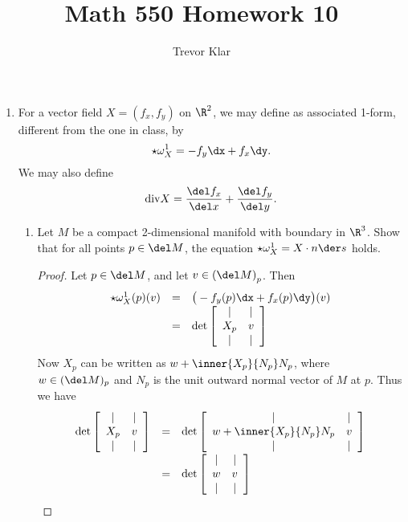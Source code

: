 \documentclass[letterpaper]{article}
\title{Math 550 \linebreak
Homework 10}
\author{Trevor Klar}
\begin{document}
\maketitle

\begin{enumerate}
\item For a vector field $X = (f_x, f_y)$ on $\R^2$, we may define as associated 1-form, different from the one in class, by 
$$\star\omega^1_X=-f_y\dx+f_x\dy.$$
We may also define 
$$\text{div} X = \frac{\del f_x}{\del x}+\frac{\del f_y}{\del y}.$$
	\begin{enumerate}
	\item Let $M$ be a compact 2-dimensional manifold with boundary in $\R^3$. Show that for all points $p\in \del M$, the equation $\star\omega^1_X = X \cdot n \der s$ holds. 
	\begin{proof}
	Let $p\in \del M$, and let $v\in \left(\del M\right)_p$. Then 
		\[\def\arraystretch{1.05}
		\begin{array}{rcl}
		\star\omega^1_X(p)(v)&=&\big(-f_y(p)\dx+f_x(p)\dy\big)(v)\\
		&=&\det 
			\left[\begin{array}{cc}
			|&|\\
			X_p & v\\
			|&|\\
			\end{array}\right]
		\end{array}\]
	Now $X_p$ can be written as $w+\inner{X_p}{N_p}N_p$, where $w\in(\del M)_p$ and $N_p$ is the unit outward normal vector of $M$ at $p$. Thus we have 
	\[\def\arraystretch{1.05}
	\begin{array}{rcl}
	\det 
			\left[\begin{array}{cc}
			|&|\\
			X_p & v\\
			|&|\\
			\end{array}\right]
	&=&
	\det 
			\left[\begin{array}{cc}
			|&|\\
			w+\inner{X_p}{N_p}N_p & v\\
			|&|\\
			\end{array}\right]
	\\
  &=&
	\det 
			\left[\begin{array}{cc}
			|&|\\
			w & v\\
			|&|\\
			\end{array}\right]

\end{array}\]
\end{proof}
\end{enumerate}
\end{enumerate}
\end{document}
